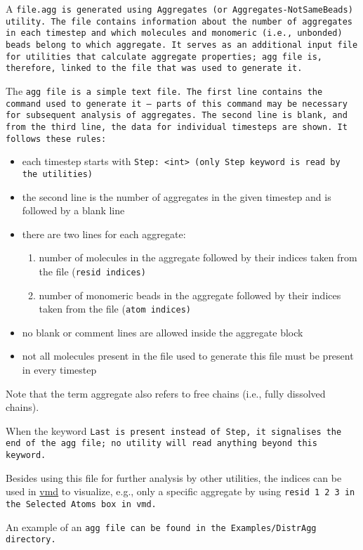 A \tt{file.agg} is generated using
\tt{Aggregates} (or \tt{Aggregates-NotSameBeads}) utility. The
file contains information about the number of aggregates in each timestep
and which molecules and monomeric (i.e., unbonded) beads belong to which
aggregate. It serves as an additional input file for utilities that
calculate aggregate properties; \tt{agg} file is, therefore, linked to
the \vcf file that was used to generate it.

The \tt{agg} file is a simple text file. The first line contains the
command used to generate it -- parts of this command may be necessary for
subsequent analysis of aggregates. The second line is blank, and from the
third line, the data for individual timesteps are shown. It follows these
rules:

\begin{itemize}[topsep=0pt,itemsep=0pt]
  \item each timestep starts with \tt{Step: <int>} (only \tt{Step}
    keyword is read by the utilities)
  \item the second line is the number of aggregates in the given
    timestep and is followed by a blank line
  \item there are two lines for each aggregate:
  \begin{enumerate}[topsep=0pt,itemsep=0pt]
    \item number of molecules in the aggregate followed by their indices
      taken from the \vsf file (\tt{resid} indices)
    \item number of monomeric beads in the aggregate followed by their
      indices taken from the \vsf file (\tt{atom} indices)
  \end{enumerate}
  \item no blank or comment lines are allowed inside the aggregate block
  \item not all molecules present in the \vcf file used to generate
    this file must be present in every timestep
\end{itemize}

Note that the term aggregate also refers to free chains (i.e., fully
dissolved chains).

When the keyword \tt{Last} is present instead of \tt{Step}, it
signalises the end of the \tt{agg} file; no utility will read anything
beyond this keyword.

Besides using this file for further analysis by other utilities, the
indices can be used in \href{http://www.ks.uiuc.edu/Research/vmd/}{vmd} to
visualize, e.g., only a specific aggregate by using \tt{resid 1 2 3} in the
\tt{Selected Atoms} box in vmd.

An example of an \tt{agg} file can be found in the \tt{Examples/DistrAgg}
directory. %

